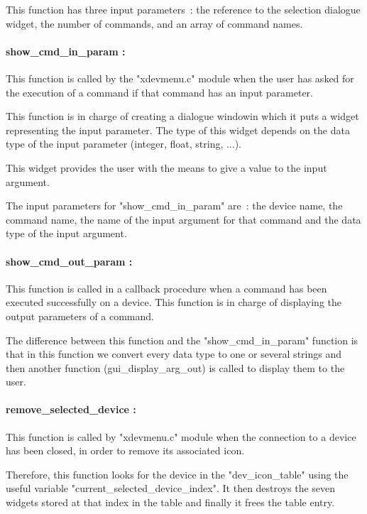 This function has three input parameters~: the reference to the selection
dialogue widget, the number of commands, and an array of command names.

\paragraph*{show\_cmd\_in\_param : }

This function is called by the "xdevmenu.c" module when the user has asked
for the execution of a command if that command has an input parameter.

This function is in charge of creating a dialogue window\footnotemark[1]
in which it puts a widget
representing the input parameter. The type of this widget depends on the
data type of the input parameter (integer, float, string, ...).

This widget provides the user with the means to give a value to the input
argument.

The input parameters for "show\_cmd\_in\_param" are~: the device name,
the command name, the name of the input argument for that command and the
data type of the input argument.

\paragraph*{show\_cmd\_out\_param : }

This function is called in a callback procedure when a command has been
executed successfully on a device. This function is in charge of displaying
the output parameters of a command.

The difference between this function and the "show\_cmd\_in\_param" function
is that in this function we convert every data type to one or several strings
and then another function (gui\_display\_arg\_out) is called to display them
to the user. 

\paragraph*{remove\_selected\_device : }

This function is called by "xdevmenu.c" module when the connection to a device
has been closed, in order to remove its associated icon.

Therefore, this function looks for the device in the "dev\_icon\_table" using
the useful variable "current\_selected\_device\_index". It then destroys the
seven widgets stored at that index in the table and finally it frees the
table entry.


